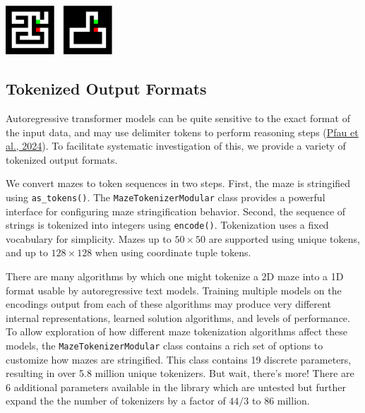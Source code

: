 \documentclass[10pt,a4paper,onecolumn]{article}
\let\origfigure\figure
\let\endorigfigure\endfigure
\renewenvironment{figure}[1][2] {
    \expandafter\origfigure\expandafter[H]
} {
    \endorigfigure
}
\begin{document}
\begin{figure}
\hypertarget{fig:e2h-raster}{%
\centering
\includegraphics[width=0.3\textwidth,height=\textheight]{figures/maze-raster-input-target.pdf}
\caption{Input is the rasterized maze without the path marked (left),
and provide as a target the maze with all but the correct path removed.
Configuration options exist to adjust whether endpoints are included and
if empty cells should be filled in.}\label{fig:e2h-raster}
}
\end{figure}

\hypertarget{tokenized-output-formats}{%
\subsection{Tokenized Output Formats}\label{tokenized-output-formats}}

Autoregressive transformer models can be quite sensitive to the exact
format of the input data, and may use delimiter tokens to perform
reasoning steps (\protect\hyperlink{ref-pfau2024dotbydot}{Pfau et al.,
2024}). To facilitate systematic investigation of this, we provide a
variety of tokenized output formats.

We convert mazes to token sequences in two steps. First, the maze is
stringified using \texttt{as\_tokens()}. The
\texttt{MazeTokenizerModular} class provides a powerful interface for
configuring maze stringification behavior. Second, the sequence of
strings is tokenized into integers using \texttt{encode()}. Tokenization
uses a fixed vocabulary for simplicity. Mazes up to \(50 \times 50\) are
supported using unique tokens, and up to \(128 \times 128\) when using
coordinate tuple tokens.

There are many algorithms by which one might tokenize a 2D maze into a
1D format usable by autoregressive text models. Training multiple models
on the encodings output from each of these algorithms may produce very
different internal representations, learned solution algorithms, and
levels of performance. To allow exploration of how different maze
tokenization algorithms affect these models, the
\texttt{MazeTokenizerModular} class contains a rich set of options to
customize how mazes are stringified. This class contains 19 discrete
parameters, resulting in over 5.8 million unique tokenizers. But wait,
there's more! There are 6 additional parameters available in the library
which are untested but further expand the the number of tokenizers by a
factor of \(44/3\) to 86 million.
\end{document}
